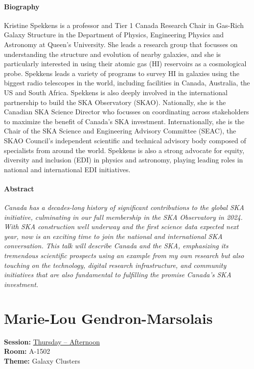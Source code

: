 \paragraph{Biography}
{\sffamily
Kristine Spekkens is a professor and Tier 1 Canada Research Chair in Gas-Rich Galaxy Structure in the Department of Physics, Engineering Physics and Astronomy at Queen's University. She leads a research group that focusses on understanding the structure and evolution of nearby galaxies, and she is particularly interested in using their atomic gas (HI) reservoirs as a cosmological probe. Spekkens leads a variety of programs to survey HI in galaxies using the biggest radio telescopes in the world, including facilities in Canada, Australia, the US and South Africa. Spekkens is also deeply involved in the international partnership to build the SKA Observatory (SKAO). Nationally, she is the Canadian SKA Science Director who focusses on coordinating across stakeholders to maximize the benefit of Canada's SKA investment. Internationally, she is the Chair of the SKA Science and Engineering Advisory Committee (SEAC), the SKAO Council's independent scientific and technical advisory body composed of specialists from around the world. Spekkens is also a strong advocate for equity, diversity and inclusion (EDI) in physics and astronomy, playing leading roles in national and international EDI initiatives.
}

\paragraph{Abstract}
{\itshape
Canada has a decades-long history of significant contributions to the global SKA initiative, culminating in our full membership in the SKA Observatory in 2024. With SKA construction well underway and the first science data expected next year, now is an exciting time to join the national and international SKA conversation. This talk will describe Canada and the SKA, emphasizing its tremendous scientific prospects using an example from my own research but also touching on the technology, digital research infrastructure, and community initiatives that are also fundamental to fulfilling the promise Canada's SKA investment.
}

\hypertarget{invited-marie-lou-gendron-marsolais}{}
\label{invited-page-marie-lou-gendron-marsolais}
\section{Marie-Lou Gendron-Marsolais}
\textbf{Session:} \hyperlink{schedule-thursday-afternoon-a-1502}{Thursday -- Afternoon}\\
\textbf{Room:} A-1502\\
\textbf{Theme:} Galaxy Clusters\\

